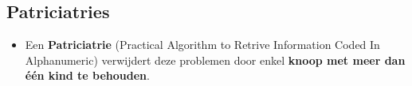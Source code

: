 \subsection{Patriciatries}
\begin{itemize}
    \alert Veel trieknopen hebben maar één kind zodat er veel ongebruikt geheugen is.
    \alert Er zijn ook twee soorten knoopen: inwendige knoop zonder sleutel maar met wijzers naar kinderen, en bladeren met sleutel maar zonder wijzers naar kinderen.
    \item Een \textbf{Patriciatrie} (Practical Algorithm to Retrive Information Coded In Alphanumeric) verwijdert deze problemen door enkel \textbf{knoop met meer dan één kind te behouden}.
\end{itemize}